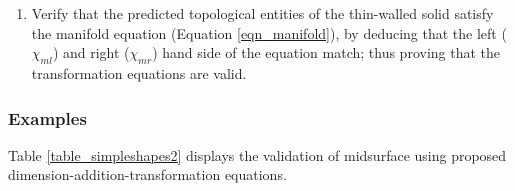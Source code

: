 \begin{enumerate}
\item Verify that the predicted topological entities of the  thin-walled solid satisfy the manifold equation (Equation \ref{eqn_manifold}), by deducing that the left ($\chi_{ml}$) and right  ($\chi_{mr}$) hand side of the equation match; thus proving that the transformation equations are valid. 
\end{enumerate}



\subsubsection{Examples}
Table \ref{table_simpleshapes2} displays the validation of midsurface using proposed dimension-addition-transformation equations.

